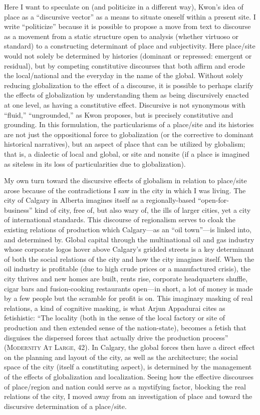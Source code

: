 \documentclass[
]{memoir}
\begin{document}
Here I want to speculate on (and politicize in a different way), Kwon's
idea of place as a ``discursive vector'' as a means to situate oneself
within a present site. I write ``politicize'' because it is possible to
propose a move from text to discourse as a movement from a static
structure open to analysis (whether virtuoso or standard) to a
constructing determinant of place and subjectivity. Here place/site
would not solely be determined by histories (dominant or repressed:
emergent or residual), but by competing constitutive discourses that
both affirm and erode the local/national and the everyday in the name of
the global. Without solely reducing globalization to the effect of a
discourse, it is possible to perhaps clarify the effects of
globalization by understanding them as being discursively enacted at one
level, as having a constitutive effect. Discursive is not synonymous
with ``fluid,'' ``ungrounded,'' as Kwon proposes, but is precisely
constitutive and grounding. In this formulation, the particularisms of a
place/site and its histories are not just the oppositional force to
globalization (or the corrective to dominant historical narratives), but
an aspect of place that can be utilized by globalism; that is, a
dialectic of local and global, or site and nonsite (if a place is
imagined as siteless in its loss of particularities due to
globalization).

My own turn toward the discursive effects of globalism in relation to
place/site arose because of the contradictions I saw in the city in
which I was living. The city of Calgary in Alberta imagines itself as a
regionally-based ``open-for-business'' kind of city, free of, but also
wary of, the ills of larger cities, yet a city of international
standards. This discourse of regionalism serves to cloak the existing
relations of production which Calgary---as an ``oil town''---is linked
into, and determined by. Global capital through the multinational oil
and gas industry whose corporate logos hover above Calgary's gridded
streets is a key determinant of both the social relations of the city
and how the city imagines itself. When the oil industry is profitable
(due to high crude prices or a manufactured crisis), the city thrives
and new homes are built, rents rise, corporate headquarters shuffle,
cigar bars and fusion-cooking restaurants open---in short, a lot of
money is made by a few people but the scramble for profit is on. This
imaginary masking of real relations, a kind of cognitive masking, is
what Arjun Appadurai cites as fetishistic: ``The locality (both in the
sense of the local factory or site of production and then extended sense
of the nation-state), becomes a fetish that disguises the dispersed
forces that actually drive the production process'' (\textsc{Modernity
At Large}, 42). In Calgary, the global forces then have a direct effect
on the planning and layout of the city, as well as the architecture; the
social space of the city (itself a constituting aspect), is determined
by the management of the effects of globalization and localization.
Seeing how the effective discourses of place/region and nation could
serve as a mystifying factor, blocking the real relations of the city, I
moved away from an investigation of place and toward the discursive
determination of a place/site.
\end{document}
